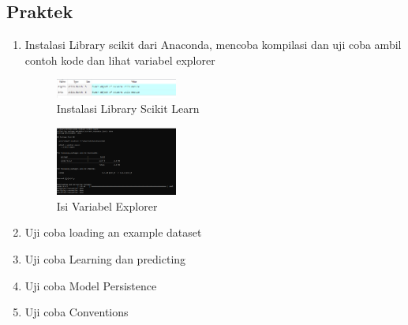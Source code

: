 \subsection{Praktek}
\begin{enumerate}
	\item Instalasi Library scikit dari Anaconda, mencoba kompilasi dan uji coba ambil contoh kode dan lihat variabel explorer
	\hfill\break
	\begin{figure}[H]
		\includegraphics[width=4cm]{figures/1174095/tugas1/materi/1.PNG}
		\centering
		\caption{Instalasi Library Scikit Learn}
	\end{figure}
	\begin{figure}[H]
		\includegraphics[width=4cm]{figures/1174095/tugas1/materi/2.PNG}
		\centering
		\caption{Isi Variabel Explorer}
	\end{figure}
	\item Uji coba loading an example dataset
	\hfill\break
	
	\item Uji coba Learning dan predicting
	\hfill\break
	
	\item Uji coba Model Persistence
	\hfill\break
	
	\item Uji coba Conventions
	\hfill\break
	
\end{enumerate}

